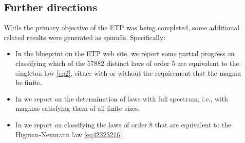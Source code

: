 \subsection{Further directions}

While the primary objective of the ETP was being completed, some additional related results were generated as spinoffs.  Specifically:
\begin{itemize}
\item In the blueprint on the ETP web site, we report some partial progress on classifying which of the $57882$ distinct laws of order $5$ are equivalent to the singleton law \eqref{eq2}, either with or without the requirement that the magma be finite.
\item In  we report on the determination of laws with full spectrum, i.e., with magmas satisfying them of all finite sizes.
\item In  we report on classifying the laws of order $8$ that are equivalent to the Higman-Neumann law \eqref{eq42323216}.
\end{itemize}
